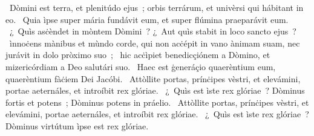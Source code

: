 \psalmChapterWithInscription{}
{ }
{%
~Dòmini est terra, et plenitúdo ejus~; orbis terrárum, et univèrsi qui hábitant in eo. 
~Quia ìpse super mária fundávit eum, et super flúmina praeparávit eum. 
~¿~Quìs asċèndet in mòntem Dòmini~? ¿~Aut quìs stabit in loco sancto ejus~? 
~ìnnoċens mànibus et mùndo corde, qui non acċépit in vano ànimam suam, nec jurávit in dolo pròximo suo~; 
~hic acċìpiet benedicçiónem a Dòmino, et mizericórdiam a Deo salutári suo. 
~Haec est ġeneráçio quaerèntium eum, quaerèntium fàċiem Dei Jacóbi. 
~Attòllite portas, prínċipes vèstri, et elevámini, portae aeternáles, et introíbit rex glóriae. 
~¿~Quìs est ìste rex glóriae~? Dòminus fortis et potens~; Dòminus potens in práelio. 
~Attòllite portas, prínċipes vèstri, et elevámini, portae aeternáles, et introíbit rex glóriae. 
~¿~Quìs est ìste rex glóriae~? Dòminus virtútum ìpse est rex glóriae. 
}
